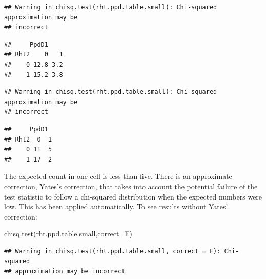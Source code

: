 \documentclass[
]{book}
\newenvironment{Shaded}{\begin{snugshade}}{\end{snugshade}}
\newcommand{\AttributeTok}[1]{\textcolor[rgb]{0.77,0.63,0.00}{#1}}
\newcommand{\FunctionTok}[1]{\textcolor[rgb]{0.00,0.00,0.00}{#1}}
\newcommand{\NormalTok}[1]{#1}
\newcommand{\SpecialCharTok}[1]{\textcolor[rgb]{0.00,0.00,0.00}{#1}}
\begin{document}
\begin{Shaded}
\end{Shaded}

\begin{verbatim}
## Warning in chisq.test(rht.ppd.table.small): Chi-squared approximation may be
## incorrect
\end{verbatim}

\begin{verbatim}
##     PpdD1
## Rht2    0   1
##    0 12.8 3.2
##    1 15.2 3.8
\end{verbatim}

\begin{Shaded}
\end{Shaded}

\begin{verbatim}
## Warning in chisq.test(rht.ppd.table.small): Chi-squared approximation may be
## incorrect
\end{verbatim}

\begin{verbatim}
##     PpdD1
## Rht2  0  1
##    0 11  5
##    1 17  2
\end{verbatim}

The expected count in one cell is less than five. There is an approximate correction, Yates's correction, that takes into account the potential failure of the test statistic to follow a chi-squared distribution when the expected numbers were low. This has been applied automatically. To see results without Yates' correction:

\begin{Shaded}
\begin{Highlighting}[]
\FunctionTok{chisq.test}\NormalTok{(rht.ppd.table.small,}\AttributeTok{correct=}\NormalTok{F)}
\end{Highlighting}
\end{Shaded}

\begin{verbatim}
## Warning in chisq.test(rht.ppd.table.small, correct = F): Chi-squared
## approximation may be incorrect
\end{verbatim}
\end{document}
